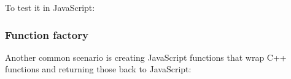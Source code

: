 \begin{Shaded}
\begin{Highlighting}[]
\OperatorTok{(}\OperatorTok{\textless{}}\OperatorTok{\textgreater{}}\OperatorTok{,}\OperatorTok{\textless{}}\OperatorTok{\textgreater{}} \OperatorTok{)} \OperatorTok{\{}
\OperatorTok{(}\OperatorTok{,} \OperatorTok{,}\OperatorTok{);}
\OperatorTok{\}}

\OperatorTok{(}\OperatorTok{,}\OperatorTok{)}

\OperatorTok{\}}  
\end{Highlighting}
\end{Shaded}

To test it in JavaScript:

\begin{Shaded}
\begin{Highlighting}[]
\OperatorTok{=} \NormalTok{(}\NormalTok{)}\OperatorTok{;}

\OperatorTok{=} \NormalTok{(}\NormalTok{)}\OperatorTok{;}
\OperatorTok{=} \NormalTok{(}\NormalTok{)}\OperatorTok{;}
\OperatorTok{,}\NormalTok{)}\OperatorTok{;}
\end{Highlighting}
\end{Shaded}

\subsubsection{Function factory}\label{function-factory}

Another common scenario is creating JavaScript functions that wrap C++
functions and returning those back to JavaScript:

